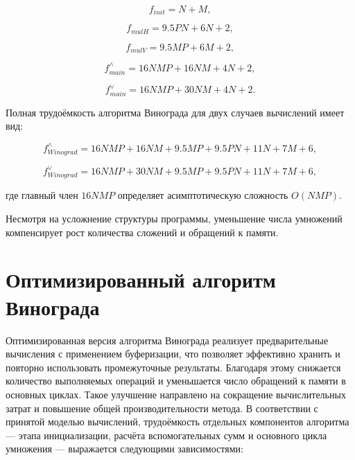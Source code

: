 \begin{equation}
	f_{init} = N + M,
\end{equation}

\begin{equation}
	f_{mulH} = 9.5PN + 6N + 2,
\end{equation}

\begin{equation}
	f_{mulV} = 9.5MP + 6M + 2,
\end{equation}

\begin{equation}
	f_{main}^{\wedge} = 16NMP + 16NM + 4N + 2,
\end{equation}

\begin{equation}
	f_{main}^{\vee} = 16NMP + 30NM + 4N + 2.
\end{equation}

Полная трудоёмкость алгоритма Винограда для двух случаев вычислений имеет вид:

\begin{equation}
	f_{Winograd}^{\wedge} = 16NMP + 16NM + 9.5MP + 9.5PN + 11N + 7M + 6,
\end{equation}

\begin{equation}
	f_{Winograd}^{\vee} = 16NMP + 30NM + 9.5MP + 9.5PN + 11N + 7M + 6,
\end{equation}

где главный член $16NMP$ определяет асимптотическую сложность $O(NMP)$.

Несмотря на усложнение структуры программы, уменьшение числа умножений компенсирует рост количества сложений и обращений к памяти.

\section{Оптимизированный алгоритм Винограда}

Оптимизированная версия алгоритма Винограда реализует предварительные вычисления с применением буферизации, что позволяет эффективно хранить и повторно использовать промежуточные результаты. Благодаря этому снижается количество выполняемых операций и уменьшается число обращений к памяти в основных циклах.
Такое улучшение направлено на сокращение вычислительных затрат и повышение общей производительности метода. В соответствии с принятой моделью вычислений, трудоёмкость отдельных компонентов алгоритма — этапа инициализации, расчёта вспомогательных сумм и основного цикла умножения — выражается следующими зависимостями:

